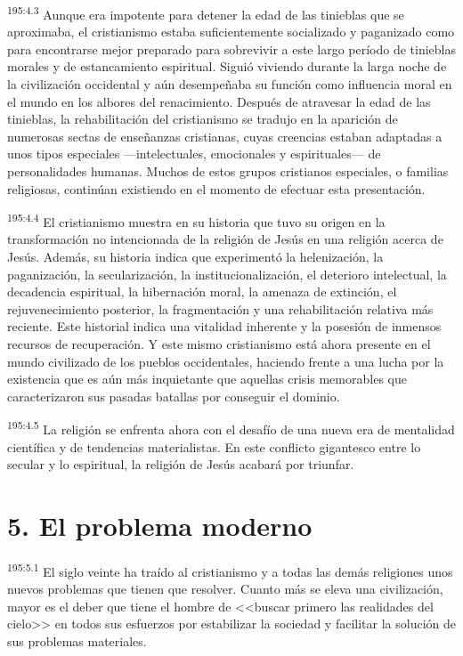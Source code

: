 \par 
\textsuperscript{195:4.3} Aunque era impotente para detener la edad de las tinieblas que se aproximaba, el cristianismo estaba suficientemente socializado y paganizado como para encontrarse mejor preparado para sobrevivir a este largo período de tinieblas morales y de estancamiento espiritual. Siguió viviendo durante la larga noche de la civilización occidental y aún desempeñaba su función como influencia moral en el mundo en los albores del renacimiento. Después de atravesar la edad de las tinieblas, la rehabilitación del cristianismo se tradujo en la aparición de numerosas sectas de enseñanzas cristianas, cuyas creencias estaban adaptadas a unos tipos especiales ---intelectuales, emocionales y espirituales--- de personalidades humanas. Muchos de estos grupos cristianos especiales, o familias religiosas, continúan existiendo en el momento de efectuar esta presentación.

\par 
\textsuperscript{195:4.4} El cristianismo muestra en su historia que tuvo su origen en la transformación no intencionada de la religión de Jesús en una religión acerca de Jesús. Además, su historia indica que experimentó la helenización, la paganización, la secularización, la institucionalización, el deterioro intelectual, la decadencia espiritual, la hibernación moral, la amenaza de extinción, el rejuvenecimiento posterior, la fragmentación y una rehabilitación relativa más reciente. Este historial indica una vitalidad inherente y la posesión de inmensos recursos de recuperación. Y este mismo cristianismo está ahora presente en el mundo civilizado de los pueblos occidentales, haciendo frente a una lucha por la existencia que es aún más inquietante que aquellas crisis memorables que caracterizaron sus pasadas batallas por conseguir el dominio.

\par 
\textsuperscript{195:4.5} La religión se enfrenta ahora con el desafío de una nueva era de mentalidad científica y de tendencias materialistas. En este conflicto gigantesco entre lo secular y lo espiritual, la religión de Jesús acabará por triunfar.

\section*{5. El problema moderno}
\par 
\textsuperscript{195:5.1} El siglo veinte ha traído al cristianismo y a todas las demás religiones unos nuevos problemas que tienen que resolver. Cuanto más se eleva una civilización, mayor es el deber que tiene el hombre de <<buscar primero las realidades del cielo>> en todos sus esfuerzos por estabilizar la sociedad y facilitar la solución de sus problemas materiales.

